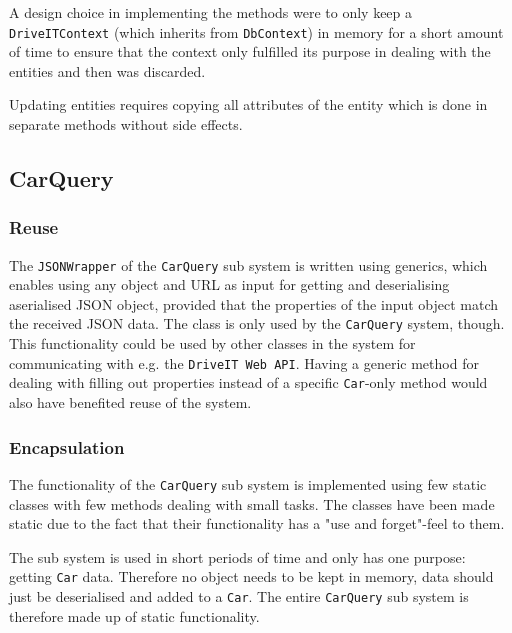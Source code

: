 A design choice in implementing the methods were to only keep a \texttt{DriveITContext} (which inherits from \texttt{DbContext}) in memory for a short amount of time to ensure that the context only fulfilled its purpose in dealing with the entities and then was discarded.

Updating entities requires copying all attributes of the entity which is done in separate methods without side effects.

\subsection{CarQuery}

\subsubsection{Reuse}
The \texttt{JSONWrapper} of the \texttt{CarQuery} sub system is written using generics, which enables using any object and URL as input for getting and deserialising aserialised JSON object, provided that the properties of the input object match the received JSON data. 
The class is only used by the \texttt{CarQuery} system, though. This functionality could be used by other classes in the system for communicating with e.g. the \texttt{DriveIT Web API}. 
Having a generic method for dealing with filling out properties instead of a specific \texttt{Car}-only method would also have benefited reuse of the system.

\subsubsection{Encapsulation}
The functionality of the \texttt{CarQuery} sub system is implemented using few static classes with few methods dealing with small tasks. The classes have been made static due to the fact that their functionality has a "use and forget"-feel to them. 

The sub system is used in short periods of time and only has one purpose: getting \texttt{Car} data. Therefore no object needs to be kept in memory, data should just be deserialised and added to a \texttt{Car}. The entire \texttt{CarQuery} sub system is therefore made up of static functionality.